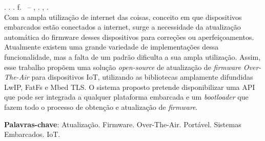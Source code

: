 
\begin{resumo}[RESUMO]
\begin{SingleSpacing}

\imprimirautorcitacao. \imprimirtitulo. \imprimirdata. \pageref {LastPage} f. \imprimirprojeto\ – \imprimirdepartamento, \imprimirinstituicao. \imprimirlocal, \imprimirdata.\\


Com a ampla utilização  de internet das coisas, conceito em que dispositivos embarcados estão conectados a internet, surge a necessidade da atualização automática do firmware desses dispositivos para correções ou aperfeiçoamentos. Atualmente existem uma grande variedade de implementações dessa funcionalidade, mas a falta de um padrão dificulta a sua ampla utilização.
Assim, esse trabalho propõem uma solução \textit{open-source} de atualização de \textit{firmware Over-The-Air} para dispositivos IoT, utilizando as bibliotecas amplamente difundidas LwIP, FatFs e Mbed TLS.
O sistema proposto pretende disponibilizar uma API que pode ser integrada a qualquer plataforma embarcada e um \textit{bootloader} que fazem todo o processo de obtenção e atualização de \textit{firmware}.

\textbf{Palavras-chave}: Atualização. Firmware. Over-The-Air. Portável. Sistemas Embarcados. IoT.




\end{SingleSpacing}
\end{resumo}



